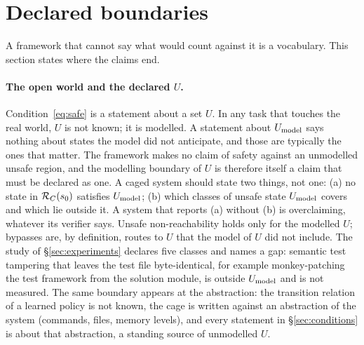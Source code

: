 \section{Declared boundaries}
\label{sec:boundaries}

A framework that cannot say what would count against it is a vocabulary. This section states where the claims end.

\paragraph{The open world and the declared $U$.}
Condition~\eqref{eq:safe} is a statement about a set $U$. In any task that touches the real world, $U$ is not known; it is modelled. A statement about $U_{\mathrm{model}}$ says nothing about states the model did not anticipate, and those are typically the ones that matter. The framework makes no claim of safety against an unmodelled unsafe region, and the modelling boundary of $U$ is therefore itself a claim that must be declared as one. A caged system should state two things, not one: (a) no state in $\mathcal{R}_{C}(s_0)$ satisfies $U_{\mathrm{model}}$; (b) which classes of unsafe state $U_{\mathrm{model}}$ covers and which lie outside it. A system that reports (a) without (b) is overclaiming, whatever its verifier says. Unsafe non-reachability holds only for the modelled $U$; bypasses are, by definition, routes to $U$ that the model of $U$ did not include. The study of \S\ref{sec:experiments} declares five classes and names a gap: semantic test tampering that leaves the test file byte-identical, for example monkey-patching the test framework from the solution module, is outside $U_{\mathrm{model}}$ and is not measured. The same boundary appears at the abstraction: the transition relation of a learned policy is not known, the cage is written against an abstraction of the system (commands, files, memory levels), and every statement in \S\ref{sec:conditions} is about that abstraction, a standing source of unmodelled $U$.

